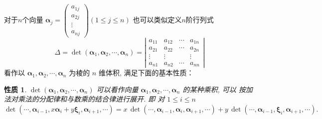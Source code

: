 \documentclass[10pt,punct]{ctexbeamer}
\newtheorem{pr3}{性质}
\begin{document}
    \begin{frame}
        对于$n$个向量 $\boldsymbol{\alpha}_j=\left(\begin{array}{c}a_{1 j} \\ a_{2 j} \\ \vdots \\ a_{n j}\end{array}\right) \left( 1 \leqslant j \leqslant n\right)$
        也可以类似定义\alert{$n$阶行列式} $$\Delta=\operatorname{det}\left(\boldsymbol{\alpha}_1, \boldsymbol{\alpha}_2, \cdots, \boldsymbol{\alpha}_n\right)=\left|\begin{array}{cccc}a_{11} & a_{12} & \cdots & a_{1 n} \\ a_{21} & a_{22} & \cdots & a_{2 n} \\ \vdots & \vdots & & \vdots \\ a_{n 1} & a_{n 2} & \cdots & a_{n n}\end{array}\right|$$
        看作以 $\boldsymbol{\alpha}_1, \boldsymbol{\alpha}_2, \cdots, \boldsymbol{\alpha}_n$ 为棱的 \alert{$n$ 维体积}, 满足下面的基本性质：
        \begin{pr3}
            $ \operatorname{det}\left(\boldsymbol{\alpha}_1, \boldsymbol{\alpha}_2, \cdots, \boldsymbol{\alpha}_n\right)$ 可以看作向量 $\boldsymbol{\alpha}_1, \boldsymbol{\alpha}_2, \cdots, \boldsymbol{\alpha}_n$ 的某种乘积, 可以 按加法对乘法的分配律和与数乘的结合律进行展开. 即 对 $1 \leqslant i \leqslant n$
            $\operatorname{det}\left(\cdots, \boldsymbol{\alpha}_{i-1}, x \boldsymbol{\alpha}_i+y \boldsymbol{\xi}_i, \boldsymbol{\alpha}_{i+1}, \cdots\right)=x\, \operatorname{det}\left(\cdots, \boldsymbol{\alpha}_{i-1}, \boldsymbol{\alpha}_i, \boldsymbol{\alpha}_{i+1}, \cdots\right)+y\, \operatorname{det}\left(\cdots, \boldsymbol{\alpha}_{i-1}, \boldsymbol{\xi}_i, \boldsymbol{\alpha}_{i+1}, \cdots\right).$

        \end{pr3}
    \end{frame}
\end{document}
